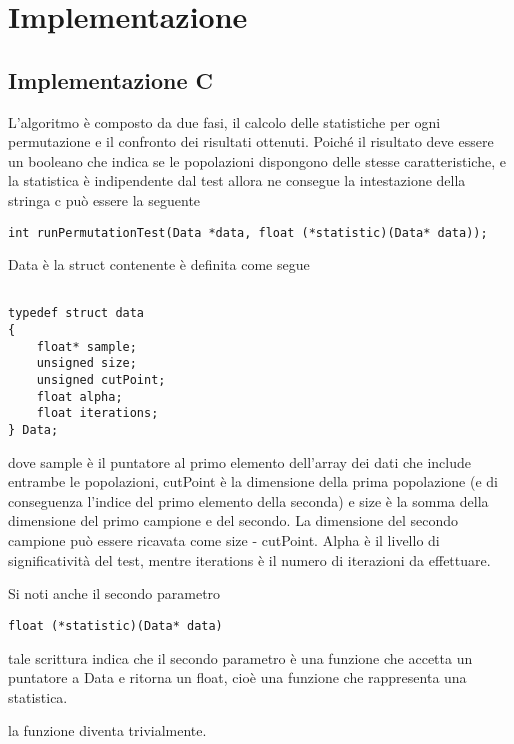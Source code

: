 \section{Implementazione}

\subsection{Implementazione C} \label{impC}
L'algoritmo è composto da due fasi, il calcolo delle statistiche per ogni permutazione e il confronto dei risultati ottenuti.
Poiché il risultato deve essere un booleano che indica se le popolazioni dispongono delle stesse caratteristiche, e la statistica è indipendente dal test allora ne consegue la intestazione della stringa c può essere la seguente


\begin{lstlisting}[style=CStyle]
int runPermutationTest(Data *data, float (*statistic)(Data* data));
\end{lstlisting}

Data è la struct contenente è definita come segue

\begin{lstlisting}[style=CStyle]

typedef struct data
{	
	float* sample;
	unsigned size;
	unsigned cutPoint;
	float alpha;
	float iterations;
} Data;

\end{lstlisting}

dove sample è il puntatore al primo elemento dell'array dei dati che include entrambe le popolazioni, cutPoint è la dimensione della prima popolazione (e di conseguenza l'indice del primo elemento della seconda) e size è la somma della dimensione del primo campione e del secondo. La dimensione del secondo campione può essere ricavata come size - cutPoint. Alpha è il livello di significatività del test, mentre iterations è il numero di iterazioni da effettuare.

Si noti anche il secondo parametro
\begin{lstlisting}[style=CStyle]
float (*statistic)(Data* data)
\end{lstlisting}

tale scrittura indica che il secondo parametro è una funzione che accetta un puntatore a Data e ritorna un float, cioè una funzione che rappresenta una statistica.

la funzione diventa trivialmente.

